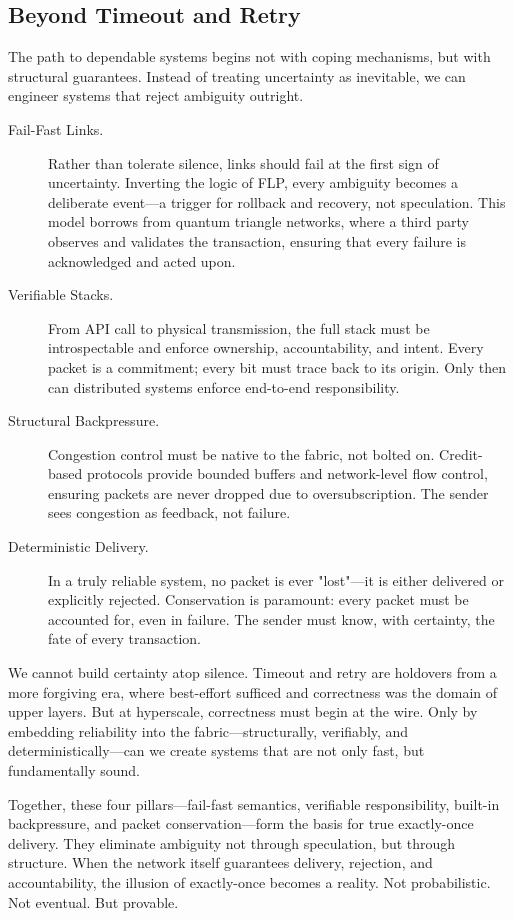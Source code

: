 \documentclass[../../../OAE-SPEC-MAIN.tex]{subfiles}
\begin{document}
\subsection*{Beyond Timeout and Retry}

The path to dependable systems begins not with coping mechanisms, but with structural guarantees. Instead of treating uncertainty as inevitable, we can engineer systems that reject ambiguity outright.

\begin{description}

  \item[Fail-Fast Links.]  
  Rather than tolerate silence, links should fail at the first sign of uncertainty. Inverting the logic of FLP, every ambiguity becomes a deliberate event—a trigger for rollback and recovery, not speculation. This model borrows from quantum triangle networks, where a third party observes and validates the transaction, ensuring that every failure is acknowledged and acted upon.

  \item[Verifiable Stacks.]  
  From API call to physical transmission, the full stack must be introspectable and enforce ownership, accountability, and intent. Every packet is a commitment; every bit must trace back to its origin. Only then can distributed systems enforce end-to-end responsibility.

  \item[Structural Backpressure.]  
  Congestion control must be native to the fabric, not bolted on. Credit-based protocols provide bounded buffers and network-level flow control, ensuring packets are never dropped due to oversubscription. The sender sees congestion as feedback, not failure.

  \item[Deterministic Delivery.]  
  In a truly reliable system, no packet is ever "lost"—it is either delivered or explicitly rejected. Conservation is paramount: every packet must be accounted for, even in failure. The sender must know, with certainty, the fate of every transaction.

\end{description}

We cannot build certainty atop silence. Timeout and retry are holdovers from a more forgiving era, where best-effort sufficed and correctness was the domain of upper layers. But at hyperscale, correctness must begin at the wire. Only by embedding reliability into the fabric—structurally, verifiably, and deterministically—can we create systems that are not only fast, but fundamentally sound.

Together, these four pillars—fail-fast semantics, verifiable responsibility, built-in backpressure, and packet conservation—form the basis for true exactly-once delivery. They eliminate ambiguity not through speculation, but through structure. When the network itself guarantees delivery, rejection, and accountability, the illusion of exactly-once becomes a reality. Not probabilistic. Not eventual. But provable.
\end{document}
